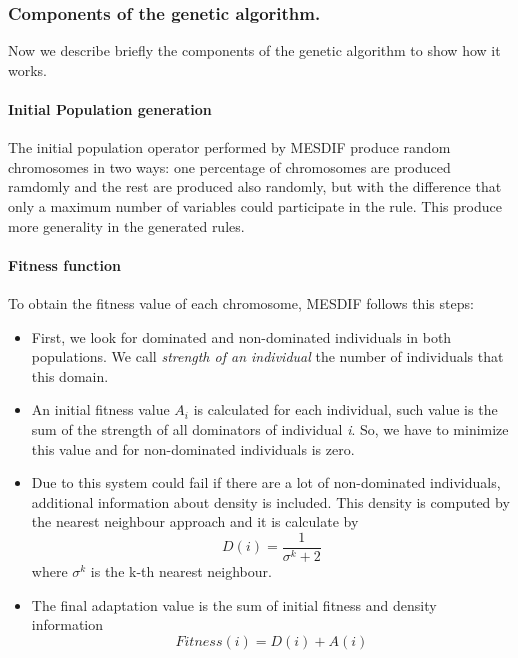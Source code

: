 \documentclass[]{article}
\begin{document}
\subsubsection{Components of the genetic
algorithm.}\label{components-of-the-genetic-algorithm.}

Now we describe briefly the components of the genetic algorithm to show
how it works.\pagebreak

\paragraph{Initial Population generation
\label{biasedInit}}\label{initial-population-generation}

The initial population operator performed by MESDIF produce random
chromosomes in two ways: one percentage of chromosomes are produced
ramdomly and the rest are produced also randomly, but with the
difference that only a maximum number of variables could participate in
the rule. This produce more generality in the generated rules.

\paragraph{Fitness function}\label{fitness-function-1}

To obtain the fitness value of each chromosome, MESDIF follows this
steps:

\begin{itemize}

\item First, we look for dominated and non-dominated individuals in both populations. We call \textit{strength of an individual} the number of individuals that this domain.
\item An initial fitness value $A_i$ is calculated for each individual, such value is the sum of the strength of all dominators of individual \textit{i}. So, we have to minimize this value and for non-dominated individuals is zero.
\item Due to this system could fail if there are a lot of non-dominated individuals, additional information about density is included. This density is computed by the nearest neighbour approach and it is calculate by \begin{equation} D(i) = \frac{1}{\sigma^k + 2} \end{equation} where $\sigma^k$ is the k-th nearest neighbour.
\item The final adaptation value is the sum of initial fitness and density information \begin{equation} Fitness(i) = D(i) + A(i) \label{fitnessMESDIF} \end{equation}

\end{itemize}
\end{document}
